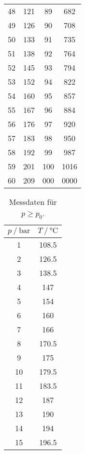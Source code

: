 \begin{table}
\begin{tabular}{S[table-format = 3.0] S[table-format = 4.0] | S[table-format = 3.0] S[table-format = 4.0]}
        48  &  121 &  89  &  682 \\
        49  &  126 &  90  &  708 \\
        50  &  133 &  91  &  735 \\
        51  &  138 &  92  &  764 \\
        52  &  145 &  93  &  794 \\
        53  &  152 &  94  &  822 \\
        54  &  160 &  95  &  857 \\
        55  &  167 &  96  &  884 \\
        56  &  176 &  97  &  920 \\
        57  &  183 &  98  &  950 \\
        58  &  192 &  99  &  987 \\
        59  &  201 &  100 & 1016 \\
        60  &  209 &  000 & 0000 \\
        \bottomrule
    \end{tabular}
\end{table}

\begin{table}
    \centering
    \caption{Messdaten für $p \geq p_0$.}
    \label{tab:Mess2}
    \begin{tabular}{S[table-format = 2.0] S[table-format = 3.1]}
        \toprule
        {$p \mathbin{/} \unit{\bar}$} & {$T \mathbin{/} \unit{\degreeCelsius}$} \\
         & 108.5 \\
        2 & 126.5 \\
        3 & 138.5 \\
        4 & 147   \\
        5 & 154   \\
        6 & 160   \\
        7 & 166   \\
        8 & 170.5 \\
        9 & 175   \\
       10 & 179.5 \\
       11 & 183.5 \\
       12 & 187   \\
       13 & 190   \\
       14 & 194   \\
       15 & 196.5 \\
       \bottomrule
    \end{tabular}   
\end{table}

